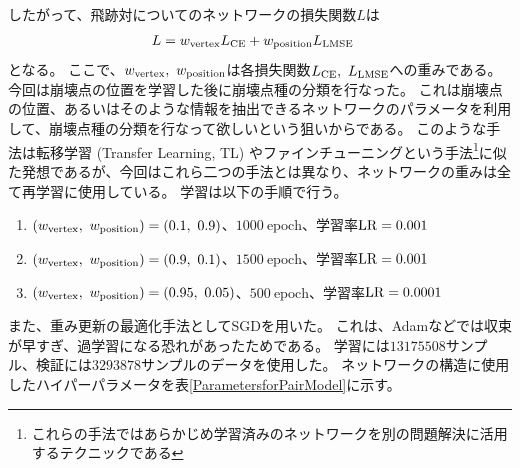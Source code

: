 したがって、飛跡対についてのネットワークの損失関数$L$は
\begin{equation}
 \begin{split}
 L & = w_{\rm vertex} L_{\rm CE} + w_{\rm position} L_{\rm LMSE}
 \end{split}
\end{equation}
となる。
ここで、$w_{\rm vertex},\ w_{\rm position}$は各損失関数$L_{\rm CE},\ L_{\rm LMSE}$への重みである。
今回は崩壊点の位置を学習した後に崩壊点種の分類を行なった。
これは崩壊点の位置、あるいはそのような情報を抽出できるネットワークのパラメータを利用して、崩壊点種の分類を行なって欲しいという狙いからである。
このような手法は転移学習 (Transfer Learning, TL) やファインチューニングという手法\footnote{これらの手法ではあらかじめ学習済みのネットワークを別の問題解決に活用するテクニックである}に似た発想であるが、今回はこれら二つの手法とは異なり、ネットワークの重みは全て再学習に使用している。
学習は以下の手順で行う。

\begin{enumerate}
 \item $(w_{\rm vertex},\ w_{\rm position})=(0.1,\ 0.9)$、$1000\ \mathrm{epoch}$、学習率${\rm LR}=0.001$
 \item $(w_{\rm vertex},\ w_{\rm position})=(0.9,\ 0.1)$、$1500\ \mathrm{epoch}$、学習率${\rm LR}=0.001$
 \item $(w_{\rm vertex},\ w_{\rm position})=(0.95,\ 0.05)$、$500\ \mathrm{epoch}$、学習率${\rm LR}=0.0001$
\end{enumerate}

また、重み更新の最適化手法としてSGDを用いた。
これは、Adamなどでは収束が早すぎ、過学習になる恐れがあったためである。
学習には$13175508$サンプル、検証には$3293878$サンプルのデータを使用した。
ネットワークの構造に使用したハイパーパラメータを表\ref{ParametersforPairModel}に示す。

